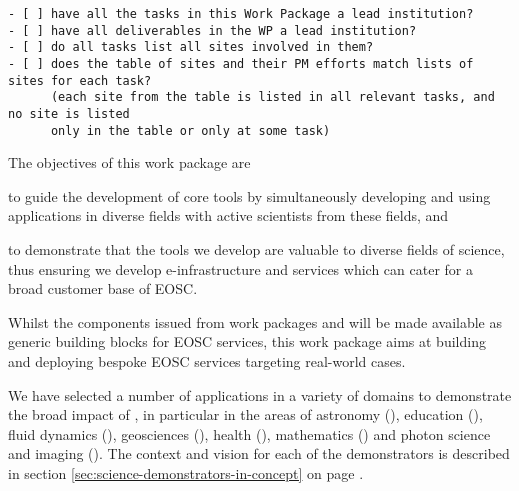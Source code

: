 \begin{draft}
\begin{verbatim}
- [ ] have all the tasks in this Work Package a lead institution?
- [ ] have all deliverables in the WP a lead institution?
- [ ] do all tasks list all sites involved in them?
- [ ] does the table of sites and their PM efforts match lists of sites for each task?
      (each site from the table is listed in all relevant tasks, and no site is listed
      only in the table or only at some task)
\end{verbatim}
\end{draft}

\begin{workpackage}[id=applications,wphases=0-48,swsites,
  title=Science demonstrators,
  short=Demonstrators,
  lead=XFEL,
  EGIRM=7,
  CDSRM=12,
  INSERMRM=24,
  QSRM=6,
  SILRM=12,
  SRLRM=9,
  UIORM=12,
  UPSUDRM=20,
  WTTRM=3,
  XFELRM=36,
  EPRM=3,
]
\begin{wpobjectives}
  The objectives of this work package are
 \begin{compactitem}
   \item to guide the development of core tools by simultaneously
     developing and using applications in diverse fields with active
     scientists from these fields, and
   \item to demonstrate that the tools we develop are valuable to diverse
     fields of science, thus ensuring we develop e-infrastructure and
     services which can cater for a broad customer base of EOSC.
   \end{compactitem}
\end{wpobjectives}

\begin{wpdescription}

  Whilst the components issued from work packages   and  will be
  made available as generic building blocks for EOSC services, this
  work package aims at building and deploying bespoke EOSC services
  targeting real-world cases.

  We have selected a number of applications in a variety of domains
  to demonstrate the broad impact of \TheProject, in particular in the
  areas of astronomy
  (), education
  (), fluid dynamics
  (), geosciences
  (), health
  (), mathematics
  () and photon science and imaging
  ().
  The context and vision for each of the demonstrators is described in
  section \ref{sec:science-demonstrators-in-concept} on page
  \pageref{sec:science-demonstrators-in-concept}.


\end{wpdescription}
\end{workpackage}
